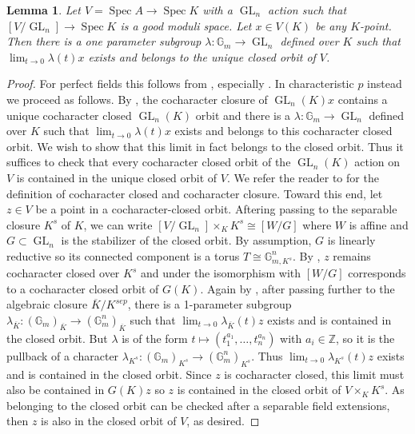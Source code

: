 \documentclass{amsart}
\newtheorem{lemma}[lemma]{Lemma}
\theoremstyle{definition}
\newcommand{\bZ}{\mathbb{Z}}
\DeclareMathOperator{\GL}{GL}
\DeclareMathOperator{\Spec}{Spec}
\newcommand{\spec}{\operatorname{Spec}}
\newcommand{\Gm}{\mathbb{G}_m}
\begin{document}
\begin{lemma}\label{lemma_kempf_for_lin_reductive}
    Let $V = \spec A \to \Spec K$ with a $\GL_n$ action such that $[V/\GL_n] \to \spec K$ is a good moduli space. Let $x \in V(K)$ be any $K$-point. Then there is a one parameter subgroup $\lambda:\Gm\to \GL_n$ defined over $K$ such that $\lim_{t\to 0}\lambda(t)x$ exists and belongs to the unique closed orbit of $V$.
\end{lemma}
\begin{proof}
For perfect fields this follows from \cite{kempf1978instability}, especially \cite[\S 4]{kempf1978instability}.
In characteristic $p$ instead we proceed as follows. By  \cite[Theorem 1.3]{bate2017cocharacter}, the cocharacter closure of $\GL_n(K)x$ contains a unique cocharacter closed $\GL_n(K)$ orbit and there is a $\lambda: \mathbb{G}_m \to \GL_n$ defined over $K$ such that $\lim_{t \to 0}\lambda(t)x$ exists and belongs to this cocharacter closed orbit. We wish to show that this limit in fact belongs to the closed orbit.
Thus it suffices to check that every cocharacter closed orbit of the $\GL_n(K)$ action on $V$ is contained in the unique closed orbit of $V$. We refer the reader to \cite{bate2017cocharacter} for the definition of cocharacter closed and cocharacter closure. Toward this end, let $z\in V$ be a point in a cocharacter-closed orbit. Aftering passing to the separable closure $K^s$ of $K$, we can write $[V/\GL_n] \times_K K^{s} \cong [W/G]$ where $W$ is affine and $G \subset \GL_n$ is the stabilizer of the closed orbit. By assumption, $G$ is linearly reductive so its connected component is a torus $T \cong \mathbb{G}_{m,K^s}^n$. By \cite[Theorem 1.5(ii)]{bate2017cocharacter}, $z$ remains cocharacter closed over $K^s$ and under the isomorphism with $[W/G]$ corresponds to a cocharacter closed orbit of $G(K)$. Again by \cite{kempf1978instability}, after passing further to the algebraic closure $\overline{K}/K^{sep}$, there is a 1-parameter
subgroup $\lambda_{\overline{K}}:(\Gm)_{\overline{K}}\to (\Gm^n)_{\overline{K}}$ such that $\lim_{t\to 0}\lambda_{\overline{K}}(t)z$ exists and is contained in the closed orbit. But $\lambda$ is of the form $t\mapsto (t_1^{a_1},\ldots,t_n^{a_n})$ with $a_i\in\bZ$, so it is the pullback of a character $\lambda_{K^s}:(\Gm)_{K^s}\to (\Gm^n)_{K^s}$. Thus $\lim_{t \to 0}\lambda_{K^s}(t)z$ exists and is contained in the closed orbit. Since $z$ is cocharacter closed, this limit must also be contained in $G(K)z$ so $z$ is contained in the closed orbit of $V\times_K K^s$. As belonging to the closed orbit can be checked after a separable field extensions, then $z$ is also in the closed orbit of $V$, as desired. 
\end{proof}
\end{document}
